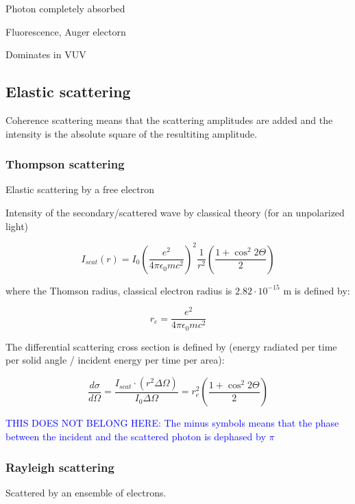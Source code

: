 Photon completely absorbed

Fluorescence, Auger electorn

Dominates in VUV

\subsection{Elastic scattering}

Coherence scattering means that the scattering amplitudes are added and the intensity is the absolute square of the resultiting amplitude.

\subsubsection{Thompson scattering}
Elastic scattering by a free electron

Intensity of the secondary/scattered wave by classical theory (for an unpolarized light)

\begin{equation}
        I_{scat}\left( r \right)= I_0 \left( \frac{e^2}{4\pi \epsilon_0 m c^2} \right)^2 \frac{1}{r^2} \left( \frac{1+\cos^2{2\Theta}}{2} \right)
\end{equation}

where the Thomson radius, classical electron radius is $2.82\cdot10^{-15}$ m is defined by:

\begin{equation}
        r_e= \frac{e^2}{4\pi\epsilon_0 m c^2}
\end{equation}

The differential scattering cross section is defined by (energy radiated per time per solid angle / incident energy per time per area):

\begin{equation}
        \label{eq:thomson_cross_section}
        \frac{d\sigma}{d\Omega}= \frac{I_{scat} \cdot \left(r^2 \Delta \Omega \right)}{I_0\Delta \Omega}=r_e^2\left( \frac{1+\cos^2{2\Theta}}{2} \right)
\end{equation}


\textcolor{blue}{THIS DOES NOT BELONG HERE: The minus symbols means that the phase between the incident and the scattered photon is dephased by $\pi$}

\subsubsection{Rayleigh scattering}
Scattered by an ensemble of electrons.

